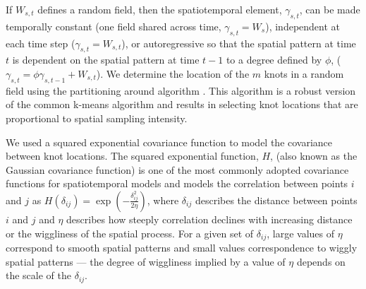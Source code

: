 \documentclass[12pt,english]{article}
\begin{document}
\begin{spacing}{1.3}
If $W_{s,t}$ defines a random field, then the spatiotemporal element,
$\gamma_{s,t}$, can be made temporally constant (one field shared across time,
$\gamma_{s,t} = W_{s}$), independent at each time step ($\gamma_{s,t} =
W_{s,t}$), or autoregressive so that the spatial pattern at time $t$ is
dependent on the spatial pattern at time $t-1$ to a degree defined by $\phi$,
($\gamma_{s,t} = \phi \gamma_{s,t-1} + W_{s,t}$).
We determine the location of the $m$ knots in a random field
using the partitioning around
algorithm \citep[the \texttt{pam} function in the R package
\textbf{cluster};][]{reynolds2006}. This algorithm is a robust version of the
common k-means algorithm and results in selecting knot locations that are
proportional to spatial sampling intensity.

We used a squared exponential covariance function to model the covariance
between knot locations. The squared exponential function, $H$, (also known as
the Gaussian covariance function) is one of the most commonly adopted
covariance functions for spatiotemporal models and models the correlation
between points $i$ and $j$ as $H(\delta_{ij}) = \exp
\left(-\frac{\delta_{ij}^2}{2 \eta} \right)$, where $\delta_{ij}$ describes the
distance between points $i$ and $j$ and $\eta$ describes how steeply
correlation declines with increasing distance or the wiggliness of the
spatial process. For a given set of $\delta_{ij}$, large values of $\eta$
correspond to smooth spatial patterns and small values correspondence to wiggly
spatial patterns --- the degree of wiggliness implied by a value of $\eta$
depends on the scale of the $\delta_{ij}$.


\end{spacing}
\end{document}
